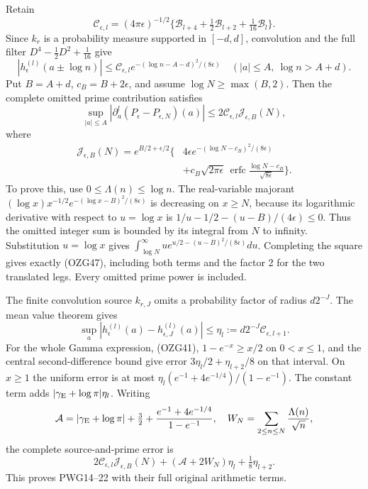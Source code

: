 \documentclass[
  10pt,
  a4paper,
]{article}
\begin{document}
Retain \[
\mathcal C_{\epsilon,l}=(4\pi\epsilon)^{-1/2}
\{\mathcal B_{l+4}+\tfrac12\mathcal B_{l+2}
+\tfrac1{16}\mathcal B_l\}.
\tag{OZG44}
\] Since \(k_r\) is a probability measure supported in \([-d,d]\),
convolution and the full filter \(D^4-\tfrac12D^2+\tfrac1{16}\) give \[
|h_\epsilon^{(l)}(a\pm\log n)|
\le\mathcal C_{\epsilon,l}
e^{-(\log n-A-d)^2/(8\epsilon)}
\quad(|a|\le A,\ \log n>A+d).
\tag{OZG45}
\] Put \(B=A+d\), \(c_B=B+2\epsilon\), and assume
\(\log N\ge\max(B,2)\). Then the complete omitted prime contribution
satisfies \[
\sup_{|a|\le A}
|\partial_a^l(P_\epsilon-P_{\epsilon,N})(a)|
\le2\mathcal C_{\epsilon,l}\mathcal J_{\epsilon,B}(N),
\tag{OZG46}
\] where \[
\begin{aligned}
\mathcal J_{\epsilon,B}(N)
=e^{B/2+\epsilon/2}\bigg\{&
4\epsilon e^{-(\log N-c_B)^2/(8\epsilon)}\\
&+c_B\sqrt{2\pi\epsilon}\,
\operatorname{erfc}\frac{\log N-c_B}{\sqrt{8\epsilon}}\bigg\}.
\end{aligned}
\tag{OZG47}
\] To prove this, use \(0\le\Lambda(n)\le\log n\). The real-variable
majorant \((\log x)x^{-1/2}e^{-(\log x-B)^2/(8\epsilon)}\) is decreasing
on \(x\ge N\), because its logarithmic derivative with respect to
\(u=\log x\) is \(1/u-1/2-(u-B)/(4\epsilon)\le0\). Thus the omitted
integer sum is bounded by its integral from \(N\) to infinity.
Substitution \(u=\log x\) gives
\(\int_{\log N}^{\infty}u e^{u/2-(u-B)^2/(8\epsilon)}du\). Completing
the square gives exactly (OZG47), including both terms and the factor 2
for the two translated legs. Every omitted prime power is included.

The finite convolution source \(k_{r,J}\) omits a probability factor of
radius \(d2^{-J}\). The mean value theorem gives \[
\sup_a|h_\epsilon^{(l)}(a)-h_{\epsilon,J}^{(l)}(a)|
\le\eta_l:=d2^{-J}\mathcal C_{\epsilon,l+1}.
\tag{OZG48}
\] For the whole Gamma expression, (OZG41), \(1-e^{-x}\ge x/2\) on
\(0<x\le1\), and the central second-difference bound give error
\(3\eta_l/2+\eta_{l+2}/8\) on that interval. On \(x\ge1\) the uniform
error is at most \(\eta_l(e^{-1}+4e^{-1/4})/(1-e^{-1})\). The constant
term adds \(|\gamma_{\rm E}+\log\pi|\eta_l\). Writing \[
\mathcal A=
|\gamma_{\rm E}+\log\pi|+\tfrac32+
\frac{e^{-1}+4e^{-1/4}}{1-e^{-1}},
\quad W_N=\sum_{2\le n\le N}\frac{\Lambda(n)}{\sqrt n},
\] the complete source-and-prime error is \[
2\mathcal C_{\epsilon,l}\mathcal J_{\epsilon,B}(N)
+(\mathcal A+2W_N)\eta_l+\tfrac18\eta_{l+2}.
\tag{OZG49}
\] This proves PWG14--22 with their full original arithmetic terms.
\end{document}

